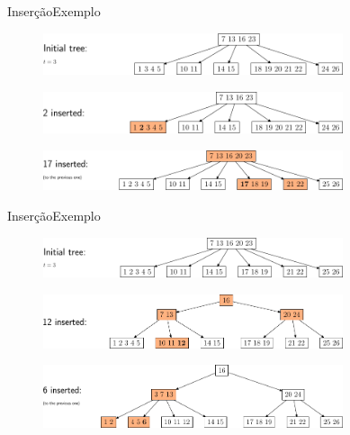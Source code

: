 \documentclass[aspectratio=169]{beamer}
\begin{document}
{\begin{frame}{Inserção}{Exemplo}
\begin{figure}[!h]
\centering
   \includegraphics[width=250pt]{imagens/insertion_ex1.png}
  \label{fig_insertion_ex1}
\end{figure} 
\begin{figure}
   \includegraphics[width=250pt]{imagens/insertion_ex2.png}
  \label{fig_insertion_ex2}
\end{figure} 
\begin{figure}  
  \includegraphics[width=250pt]{imagens/insertion_ex3.png}
  \label{fig_insertion_ex3}  
\end{figure} 
\end{frame}


\begin{frame}{Inserção}{Exemplo}
\begin{figure}[!h]
\centering
   \includegraphics[width=250pt]{imagens/insertion_ex4.png}
  \label{fig_insertion_ex4}
\end{figure} 
\begin{figure}
   \includegraphics[width=250pt]{imagens/insertion_ex5.png}
  \label{fig_insertion_ex5}
\end{figure} 
\begin{figure}  
  \includegraphics[width=250pt]{imagens/insertion_ex6.png}
  \label{fig_insertion_ex6}  
\end{figure} 
\end{frame}

}
\end{document}
